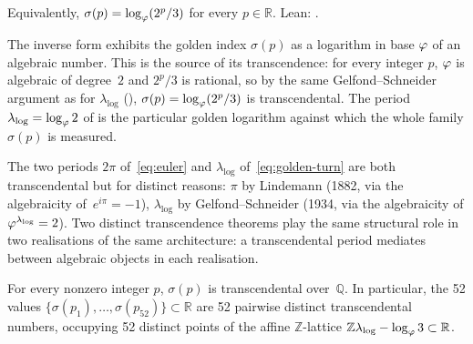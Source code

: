 \begin{Corollary}\label{cor:inverse}
Equivalently, $\sigma(p)=\log_{\varphi}(2^{p}/3)$ for every $p\in\mathbb{R}$.
Lean: .
\end{Corollary}

\begin{Remark}\label{rem:index-logarithm}
The inverse form exhibits the golden index $\sigma(p)$ as a logarithm in
base $\varphi$ of an algebraic number.  This is the source of its
transcendence: for every integer $p$, $\varphi$ is algebraic of
degree~$2$ and $2^{p}/3$ is rational, so by the same Gelfond--Schneider
argument as for $\lambda_{\log}$ (),
$\sigma(p)=\log_{\varphi}(2^{p}/3)$ is transcendental.  The period
$\lambda_{\log}=\log_{\varphi}2$ of  is the
particular golden logarithm against which the whole family $\sigma(p)$ is
measured.
\end{Remark}

\begin{Remark}
\label{rem:two-transcendences}
The two periods $2\pi$ of~\eqref{eq:euler} and $\lambda_{\log}$
of~\eqref{eq:golden-turn} are both transcendental but for distinct
reasons: $\pi$ by Lindemann (1882, via the algebraicity
of~$e^{i\pi}=-1$), $\lambda_{\log}$ by Gelfond--Schneider (1934, via
the algebraicity of $\varphi^{\lambda_{\log}}=2$).  Two distinct
transcendence theorems play the same structural role in two
realisations of the same architecture: a transcendental period
mediates between algebraic objects in each realisation.
\end{Remark}

\begin{Corollary}
\label{cor:linear-independence}
For every nonzero integer $p$, $\sigma(p)$ is transcendental
over~$\mathbb{Q}$.  In particular, the 52 values
$\{\sigma(p_{1}),\ldots,\sigma(p_{52})\}\subset\mathbb{R}$ are 52 pairwise
distinct transcendental numbers, occupying 52 distinct points of the
affine $\mathbb{Z}$-lattice $\mathbb{Z}\lambda_{\log}-\log_{\varphi}3\subset\mathbb{R}$.
\end{Corollary}

